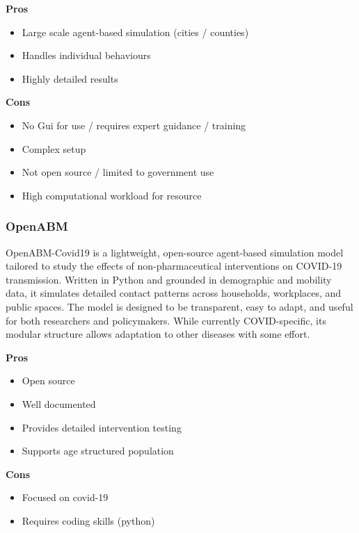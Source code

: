 \noindent
\begin{minipage}[t]{0.48\textwidth}
\textbf{Pros}
\begin{itemize}
    \item Large scale agent-based simulation (cities / counties)
    \item Handles individual behaviours
    \item Highly detailed results
\end{itemize}
\end{minipage}
\hfill
\begin{minipage}[t]{0.48\textwidth}
\textbf{Cons}
\begin{itemize}
    \item No Gui for use / requires expert guidance / training
    \item Complex setup
    \item Not open source / limited to government use
    \item High computational workload for resource
\end{itemize}
\end{minipage}


\subsubsection*{OpenABM}
OpenABM-Covid19 is a lightweight, open-source agent-based simulation model tailored to study the effects of non-pharmaceutical interventions on COVID-19 transmission. Written in Python and grounded in demographic and mobility data, it simulates detailed contact patterns across households, workplaces, and public spaces. The model is designed to be transparent, easy to adapt, and useful for both researchers and policymakers. While currently COVID-specific, its modular structure allows adaptation to other diseases with some effort.

\noindent
\begin{minipage}[t]{0.48\textwidth}
\textbf{Pros}
\begin{itemize}
    \item Open source
    \item Well documented
    \item Provides detailed intervention testing
    \item Supports age structured population
\end{itemize}
\end{minipage}
\hfill
\begin{minipage}[t]{0.48\textwidth}
\textbf{Cons}
\begin{itemize}
    \item Focused on covid-19
    \item Requires coding skills (python)
\end{itemize}
\end{minipage}


